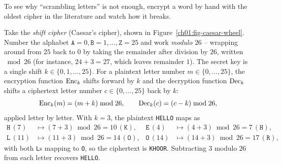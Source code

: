 To see why ``scrambling letters'' is not enough, encrypt a word by hand with the oldest cipher in the literature and watch how it breaks.

Take the \emph{shift cipher} (Caesar's cipher), shown in Figure~\ref{ch01:fig-caesar-wheel}. Number the alphabet $\texttt{A} = 0, \texttt{B} = 1, \dots, \texttt{Z} = 25$ and work \emph{modulo $26$} -- wrapping around from $25$ back to $0$ by taking the remainder after division by $26$, written $\bmod 26$ (for instance, $24 + 3 = 27$, which leaves remainder $1$). The secret key is a single shift $k \in \{0, 1, \dots, 25\}$. For a plaintext letter number $m \in \{0, \dots, 25\}$, the encryption function $\operatorname{Enc}_k$ shifts forward by $k$ and the decryption function $\operatorname{Dec}_k$ shifts a ciphertext letter number $c \in \{0, \dots, 25\}$ back by $k$:
\[
\operatorname{Enc}_k(m) = (m + k) \bmod 26, \qquad \operatorname{Dec}_k(c) = (c - k) \bmod 26,
\]
applied letter by letter. With $k = 3$, the plaintext \texttt{HELLO} maps as
\begin{align*}
\texttt{H}\,(7) &\mapsto (7 + 3) \bmod 26 = 10\,(\texttt{K}), &
\texttt{E}\,(4) &\mapsto (4 + 3) \bmod 26 = 7\,(\texttt{H}), \\
\texttt{L}\,(11) &\mapsto (11 + 3) \bmod 26 = 14\,(\texttt{O}), &
\texttt{O}\,(14) &\mapsto (14 + 3) \bmod 26 = 17\,(\texttt{R}),
\end{align*}
with both \texttt{L}s mapping to \texttt{O}, so the ciphertext is \texttt{KHOOR}. Subtracting $3$ modulo $26$ from each letter recovers \texttt{HELLO}.

